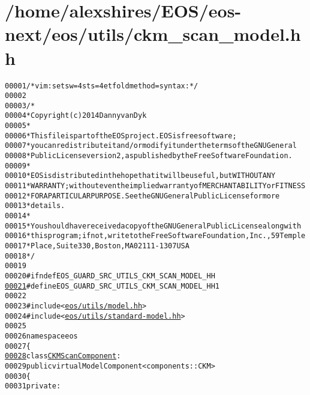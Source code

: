 \hypertarget{ckm__scan__model_8hh_source}{
\section{/home/alexshires/EOS/eos-\/next/eos/utils/ckm\_\-scan\_\-model.hh}
}


\begin{footnotesize}\begin{alltt}
00001 \textcolor{comment}{/* vim: set sw=4 sts=4 et foldmethod=syntax : */}
00002 
00003 \textcolor{comment}{/*}
00004 \textcolor{comment}{ * Copyright (c) 2014 Danny van Dyk}
00005 \textcolor{comment}{ *}
00006 \textcolor{comment}{ * This file is part of the EOS project. EOS is free software;}
00007 \textcolor{comment}{ * you can redistribute it and/or modify it under the terms of the GNU General}
00008 \textcolor{comment}{ * Public License version 2, as published by the Free Software Foundation.}
00009 \textcolor{comment}{ *}
00010 \textcolor{comment}{ * EOS is distributed in the hope that it will be useful, but WITHOUT ANY}
00011 \textcolor{comment}{ * WARRANTY; without even the implied warranty of MERCHANTABILITY or FITNESS}
00012 \textcolor{comment}{ * FOR A PARTICULAR PURPOSE.  See the GNU General Public License for more}
00013 \textcolor{comment}{ * details.}
00014 \textcolor{comment}{ *}
00015 \textcolor{comment}{ * You should have received a copy of the GNU General Public License along with}
00016 \textcolor{comment}{ * this program; if not, write to the Free Software Foundation, Inc., 59 Temple}
00017 \textcolor{comment}{ * Place, Suite 330, Boston, MA  02111-1307  USA}
00018 \textcolor{comment}{ */}
00019 
00020 \textcolor{preprocessor}{#ifndef EOS\_GUARD\_SRC\_UTILS\_CKM\_SCAN\_MODEL\_HH}
\hypertarget{ckm__scan__model_8hh_source_l00021}{}\hyperlink{ckm__scan__model_8hh_a7a6f2d2b41545d4b1ca5749795e62237}{00021} \textcolor{preprocessor}{}\textcolor{preprocessor}{#define EOS\_GUARD\_SRC\_UTILS\_CKM\_SCAN\_MODEL\_HH 1}
00022 \textcolor{preprocessor}{}
00023 \textcolor{preprocessor}{#include <\hyperlink{model_8hh}{eos/utils/model.hh}>}
00024 \textcolor{preprocessor}{#include <\hyperlink{standard-model_8hh}{eos/utils/standard-model.hh}>}
00025 
00026 \textcolor{keyword}{namespace }eos
00027 \{
\hypertarget{ckm__scan__model_8hh_source_l00028}{}\hyperlink{classeos_1_1CKMScanComponent}{00028}     \textcolor{keyword}{class }\hyperlink{classeos_1_1CKMScanComponent}{CKMScanComponent} :
00029         \textcolor{keyword}{public} \textcolor{keyword}{virtual} ModelComponent<components::CKM>
00030     \{
00031         \textcolor{keyword}{private}:

\end{alltt}
\end{footnotesize}
